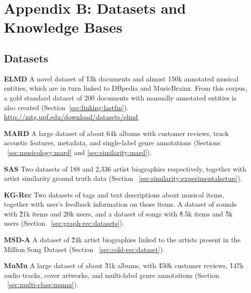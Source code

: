 
\chapter{Appendix B: Datasets and Knowledge Bases}
\label{appendix:datasets}

\section{Datasets}
\label{appendix:datasets:datasets}

\noindent \textbf{ELMD} A novel dataset of \~13k documents and almost 150k annotated musical entities, which are in turn linked to DBpedia and MusicBrainz. From this corpus, a gold standard dataset of 200 documents with manually annotated entities is also created (Section~\ref{sec:linking:lastfm}). \url{http://mtg.upf.edu/download/datasets/elmd}

\vspace{0.2cm}

\noindent \textbf{MARD} A large dataset of about 64k albums with customer reviews, track acoustic features, metadata, and single-label genre annotations (Sections ~\ref{sec:musicology:mard} and \ref{sec:similarity:mard}).

\vspace{0.2cm}

\noindent \textbf{SAS} Two datasets of 188 and 2,336 artist biographies respectively, together with artist similarity ground truth data (Section ~\ref{sec:similarity:experimentalsetup}).

\vspace{0.2cm}

\noindent \textbf{KG-Rec} Two datasets of tags and text descriptions about musical items, together with user's feedback information on those items. A dataset of sounds with \~21k items and 20k users, and a dataset of songs with \~8.5k items and \~5k users (Section ~\ref{sec:graph-rec:datasets}).

\vspace{0.2cm}

\noindent \textbf{MSD-A} A dataset of \~24k artist biographies linked to the artists present in the Million Song Dataset (Section ~\ref{sec:cold-rec:dataset}).

\vspace{0.2cm}

\noindent \textbf{MuMu} A large dataset of about \~31k albums, with \~450k customer reviews, \~147k audio tracks, cover artworks, and multi-label genre annotations (Section ~\ref{sec:multi-class:mumu}).

